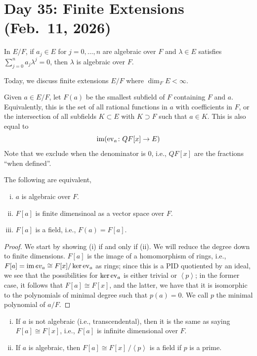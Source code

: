 \section{Day 35: Finite Extensions (Feb.\ 11, 2026)}
\begin{theorem}
    In $E/F$, if $a_j \in E$ for $j = 0, \dots, n$ are algebraic over $F$ and $\lambda \in E$ satisfies $\sum_{j=0}^n a_j \lambda^j = 0$, then $\lambda$ is algebraic over $F$.
\end{theorem}
Today, we discuss finite extensions $E/F$ where $\dim_F E < \infty$.
\begin{definition}
    Given $a \in E/F$, let $F(a)$ be the smallest subfield of $F$ containing $F$ and $a$. Equivalently, this is the set of all rational functions in $a$ with coefficients in $F$, or the intersection of all subfields $K \subset E$ with $K \supset F$ such that $a \in K$. This is also equal to
    \[ \operatorname{im} (\operatorname{ev}_a \colon Q F[x] \to E) \]
    Note that we exclude when the denominator is $0$, i.e., $Q F[x]$ are the fractions ``when defined''.
\end{definition}
\begin{theorem}
    The following are equivalent,
    \begin{enumerate}[(i)]
        \item $a$ is algebraic over $F$.
        \item $F[a]$ is finite dimensinoal as a vector space over $F$.
        \item $F[a]$ is a field, i.e., $F(a) = F[a]$.
    \end{enumerate}
\end{theorem}
\begin{proof}
    We start by showing (i) if and only if (ii). We will reduce the degree down to finite dimensions. $F[a]$ is the image of a homomorphism of rings, i.e., $F[a] = \operatorname{im} ev_a \cong F[x] / \ker \operatorname{ev}_a$ as rings; since this is a PID quotiented by an ideal, we see that the possibilities for $\ker \operatorname{ev}_a$ is either trivial or $\left<p\right>$; in the former case, it follows that $F[a] \cong F[x]$, and the latter, we have that it is isomorphic to the polynomials of minimal degree such that $p(a) = 0$. We call $p$ the minimal polynomial of $a/F$.
\end{proof}
\begin{enumerate}[(i)]
    \item If $a$ is not algebraic (i.e., transcendental), then it is the same as saying $F[a] \cong F[x]$, i.e., $F[a]$ is infinite dimensional over $F$.
    \item If $a$ is algebraic, then $F[a] \cong F[x] \,/\! \left<p\right>$ is a field if $p$ is a prime.
\end{enumerate}
